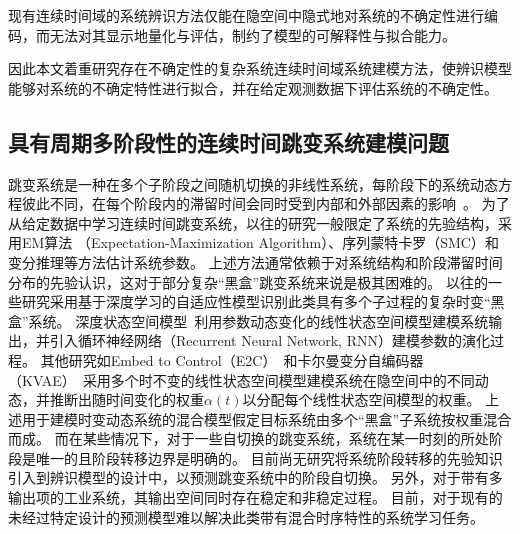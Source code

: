 现有连续时间域的系统辨识方法仅能在隐空间中隐式地对系统的不确定性进行编码，而无法对其显示地量化与评估，制约了模型的可解释性与拟合能力。

因此本文着重研究存在不确定性的复杂系统连续时间域系统建模方法，使辨识模型能够对系统的不确定特性进行拟合，并在给定观测数据下评估系统的不确定性。

\subsection{具有周期多阶段性的连续时间跳变系统建模问题}
跳变系统是一种在多个子阶段之间随机切换的非线性系统，每阶段下的系统动态方程彼此不同，在每个阶段内的滞留时间会同时受到内部和外部因素的影响~\cite{WANG2022111790}。
为了从给定数据中学习连续时间跳变系统，以往的研究一般限定了系统的先验结构，采用EM算法 （Expectation-Maximization Algorithm）\cite{balenzuela2022parameter}、序列蒙特卡罗（SMC）\cite{6859280}和变分推理\cite{opper2007variational}等方法估计系统参数。
上述方法通常依赖于对系统结构和阶段滞留时间分布的先验认识，这对于部分复杂“黑盒”跳变系统来说是极其困难的。
以往的一些研究采用基于深度学习的自适应性模型识别此类具有多个子过程的复杂时变“黑盒”系统。
深度状态空间模型~\cite{Deep_state_space_model}利用参数动态变化的线性状态空间模型建模系统输出，并引入循环神经网络（Recurrent Neural Network, RNN）建模参数的演化过程。
其他研究如Embed to Control（E2C）~\cite{Watter2015}和卡尔曼变分自编码器（KVAE）~\cite{Fraccaro2017}采用多个时不变的线性状态空间模型建模系统在隐空间中的不同动态，并推断出随时间变化的权重$\alpha(t)$以分配每个线性状态空间模型的权重。
上述用于建模时变动态系统的混合模型假定目标系统由多个“黑盒”子系统按权重混合而成。
而在某些情况下，对于一些自切换的跳变系统，系统在某一时刻的所处阶段是唯一的且阶段转移边界是明确的。
目前尚无研究将系统阶段转移的先验知识引入到辨识模型的设计中，以预测跳变系统中的阶段自切换。  
另外，对于带有多输出项的工业系统，其输出空间同时存在稳定和非稳定过程\cite{nason2006stationary}。
目前，对于现有的未经过特定设计的预测模型难以解决此类带有混合时序特性的系统学习任务。

